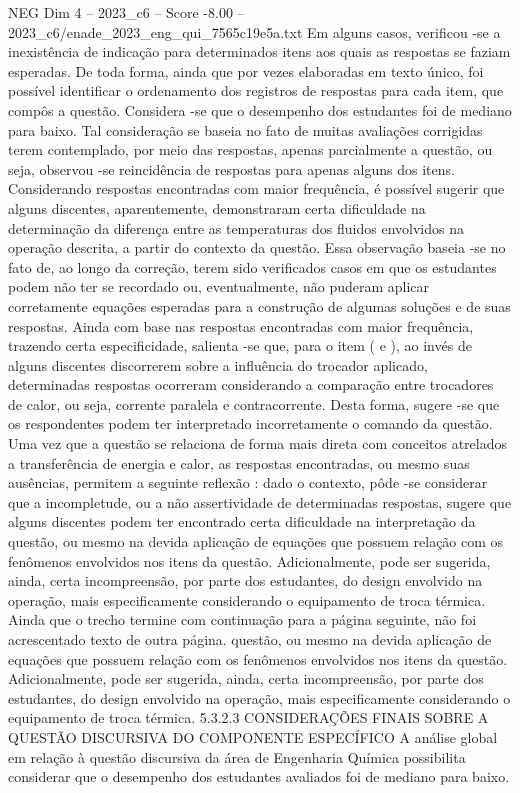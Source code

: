 \begin{textsample}{NEG Dim 4 – 2023\_c6 – Score -8.00 – 2023\_c6/enade\_2023\_eng\_qui\_7565c19e5a.txt}
Em alguns casos, verificou -se a inexistência de indicação para determinados itens aos quais as respostas se faziam esperadas.
De toda forma, ainda que por vezes elaboradas em texto único, foi possível identificar o ordenamento dos registros de respostas para cada item, que compôs a questão.
Considera -se que o desempenho dos estudantes foi de mediano para baixo.
Tal consideração se baseia no fato de muitas avaliações corrigidas terem contemplado, por meio das respostas, apenas parcialmente a questão, ou seja, observou -se reincidência de respostas para apenas alguns dos itens.
Considerando respostas encontradas com maior frequência, é possível sugerir que alguns discentes, aparentemente, demonstraram certa dificuldade na determinação da diferença entre as temperaturas dos fluidos envolvidos na operação descrita, a partir do contexto da questão.
Essa observação baseia -se no fato de, ao longo da correção, terem sido verificados casos em que os estudantes podem não ter se recordado ou, eventualmente, não puderam aplicar corretamente equações esperadas para a construção de algumas soluções e de suas respostas.
Ainda com base nas respostas encontradas com maior frequência, trazendo certa especificidade, salienta -se que, para o item ( e ), ao invés de alguns discentes discorrerem sobre a influência do trocador aplicado, determinadas respostas ocorreram considerando a comparação entre trocadores de calor, ou seja, corrente paralela e contracorrente.
Desta forma, sugere -se que os respondentes podem ter interpretado incorretamente o comando da questão.
Uma vez que a questão se relaciona de forma mais direta com conceitos atrelados a transferência de energia e calor, as respostas encontradas, ou mesmo suas ausências, permitem a seguinte reflexão : dado o contexto, pôde -se considerar que a incompletude, ou a não assertividade de determinadas respostas, sugere que alguns discentes podem ter encontrado certa dificuldade na interpretação da questão, ou mesmo na devida aplicação de equações que possuem relação com os fenômenos envolvidos nos itens da questão.
Adicionalmente, pode ser sugerida, ainda, certa incompreensão, por parte dos estudantes, do design envolvido na operação, mais especificamente considerando o equipamento de troca térmica.
Ainda que o trecho termine com continuação para a página seguinte, não foi acrescentado texto de outra página. questão, ou mesmo na devida aplicação de equações que possuem relação com os fenômenos envolvidos nos itens da questão.
Adicionalmente, pode ser sugerida, ainda, certa incompreensão, por parte dos estudantes, do design envolvido na operação, mais especificamente considerando o equipamento de troca térmica. 5.3.2.3 CONSIDERAÇÕES FINAIS SOBRE A QUESTÃO DISCURSIVA DO COMPONENTE ESPECÍFICO A análise global em relação à questão discursiva da área de Engenharia Química possibilita considerar que o desempenho dos estudantes avaliados foi de mediano para baixo.

\end{textsample}
